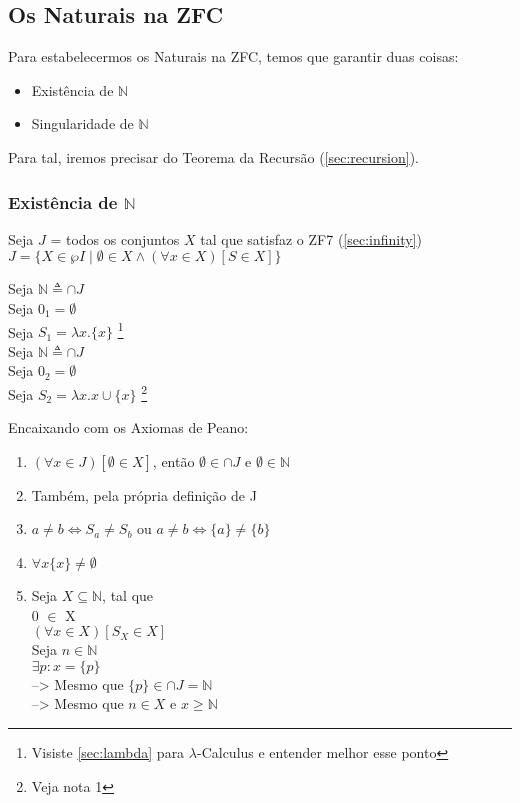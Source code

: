 \documentclass[12pt, a4paper]{article}
\begin{document}
\subsection{Os Naturais na ZFC}
Para estabelecermos os Naturais na ZFC, temos que garantir duas coisas:
\begin{itemize}
\item Existência de $\mathbb{N}$
\item Singularidade de $\mathbb{N}$
\end{itemize}

Para tal, iremos precisar do Teorema da Recursão (\ref{sec:recursion}).

\subsubsection{Existência de $\mathbb{N}$}
Seja $J$ = todos os conjuntos $X$ tal que satisfaz o ZF7 (\ref{sec:infinity})\\
$J = \{X \in \wp I \mid \emptyset \in X \land (\forall x \in X)[S \in X]\}$\\
\begin{multicols}{2}
\noindent Seja $\mathbb{N} \triangleq \cap J$\\
Seja $0_1 = \emptyset$\\
Seja $S_1 = \lambda x.\{x\}$ \footnote{Visiste \ref{sec:lambda} para $\lambda$-Calculus e entender melhor esse ponto}\\

\noindent Seja $\mathbb{N} \triangleq \cap J$\\
Seja $0_2 = \emptyset$\\
Seja $S_2 = \lambda x.x \cup \{x\} $ \footnote{Veja nota 1}
\end{multicols}

Encaixando com os Axiomas de Peano:
\begin{enumerate}
\item $(\forall x \in J)[\emptyset \in X]$, então $\emptyset \in \cap J$ e $\emptyset \in \mathbb{N}$
\item Também, pela própria definição de J
\item $a \neq b \iff S_a \neq S_b$ ou $a \neq b \iff \{a\} \neq \{b\}$
\item $\forall x \{x\} \neq \emptyset$
\item Seja $X \subseteq \mathbb{N}$, tal que\\
0 $\in$ X\\
$(\forall x \in X)[S_X \in X]$\\
Seja $n \in \mathbb{N}$\\
$\exists p : x = \{p\}$\\
--> Mesmo que $\{p\} \in \cap J = \mathbb{N}$\\
--> Mesmo que $n \in X$ e $x \geq \mathbb{N}$
\end{enumerate}
\end{document}
